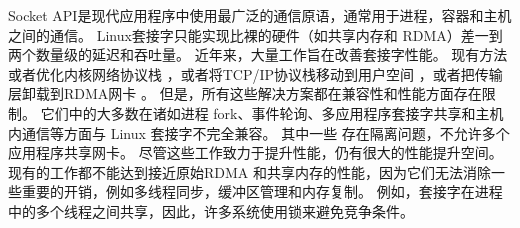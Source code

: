 
Socket API是现代应用程序中使用最广泛的通信原语，通常用于进程，容器和主机之间的通信。
Linux套接字只能实现比裸的硬件（如共享内存和 RDMA）差一到两个数量级的延迟和吞吐量。
近年来，大量工作旨在改善套接字性能。
现有方法或者优化内核网络协议栈 \cite {lin2016scalable,han2012megapipe,yasukata2016stackmap}，或者将TCP/IP协议栈移动到用户空间 \cite {jeong2014mtcp,marinos2014network,seastar,fstack,libvma}，或者把传输层卸载到RDMA网卡 \cite{rsockets,socketsdirect}。
但是，所有这些解决方案都在兼容性和性能方面存在限制。
它们中的大多数在诸如进程 fork、事件轮询、多应用程序套接字共享和主机内通信等方面与 Linux 套接字不完全兼容。
其中一些 \cite {jeong2014mtcp} 存在隔离问题，不允许多个应用程序共享网卡。
尽管这些工作致力于提升性能，仍有很大的性能提升空间。现有的工作都不能达到接近原始RDMA 和共享内存的性能，因为它们无法消除一些重要的开销，例如多线程同步，缓冲区管理和内存复制。
例如，套接字在进程中的多个线程之间共享，因此，许多系统使用锁来避免竞争条件。

